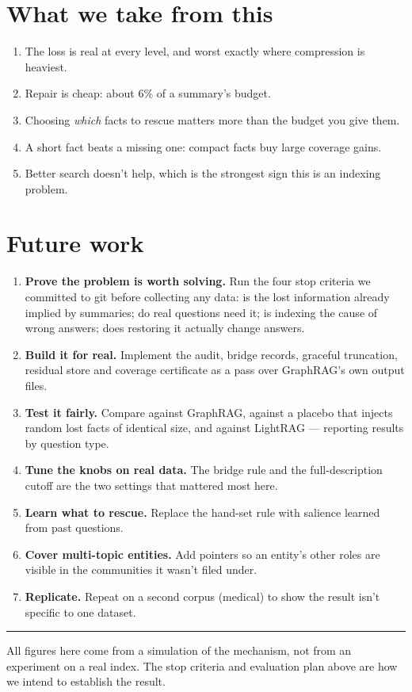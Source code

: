\documentclass[11pt]{article}
\begin{document}
\section{What we take from this}

\begin{enumerate}
  \item The loss is real at every level, and worst exactly where compression is heaviest.
  \item Repair is cheap: about 6\% of a summary's budget.
  \item Choosing \emph{which} facts to rescue matters more than the budget you give them.
  \item A short fact beats a missing one: compact facts buy large coverage gains.
  \item Better search doesn't help, which is the strongest sign this is an indexing problem.
\end{enumerate}

\section{Future work}

\begin{enumerate}
  \item \textbf{Prove the problem is worth solving.} Run the four stop criteria we committed to git before collecting any data: is the lost information already implied by summaries; do real questions need it; is indexing the cause of wrong answers; does restoring it actually change answers.
  \item \textbf{Build it for real.} Implement the audit, bridge records, graceful truncation, residual store and coverage certificate as a pass over GraphRAG's own output files.
  \item \textbf{Test it fairly.} Compare against GraphRAG, against a placebo that injects random lost facts of identical size, and against LightRAG --- reporting results by question type.
  \item \textbf{Tune the knobs on real data.} The bridge rule and the full-description cutoff are the two settings that mattered most here.
  \item \textbf{Learn what to rescue.} Replace the hand-set rule with salience learned from past questions.
  \item \textbf{Cover multi-topic entities.} Add pointers so an entity's other roles are visible in the communities it wasn't filed under.
  \item \textbf{Replicate.} Repeat on a second corpus (medical) to show the result isn't specific to one dataset.
\end{enumerate}

\vspace{6pt}
\hrule
\vspace{4pt}
{\footnotesize\color{ink2} All figures here come from a simulation of the mechanism, not from an experiment on a real index. The stop criteria and evaluation plan above are how we intend to establish the result.}
\end{document}
